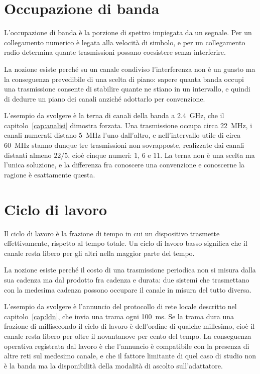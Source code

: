 \section{Occupazione di banda}

L'occupazione di banda è la porzione di spettro impiegata da un segnale. Per un collegamento numerico è legata alla velocità di simbolo, e per un collegamento radio determina quante trasmissioni possano coesistere senza interferire.

La nozione esiste perché su un canale condiviso l'interferenza non è un guasto ma la conseguenza prevedibile di una scelta di piano: sapere quanta banda occupi una trasmissione consente di stabilire quante ne stiano in un intervallo, e quindi di dedurre un piano dei canali anziché adottarlo per convenzione.

L'esempio da svolgere è la terna di canali della banda a \SI{2,4}{GHz}, che il capitolo~\ref{cap:analisi} dimostra forzata. Una trasmissione occupa circa \SI{22}{MHz}, i canali numerati distano \SI{5}{MHz} l'uno dall'altro, e nell'intervallo utile di circa \SI{60}{MHz} stanno dunque tre trasmissioni non sovrapposte, realizzate dai canali distanti almeno $22/5$, cioè cinque numeri: $1$, $6$ e $11$. La terna non è una scelta ma l'unica soluzione, e la differenza fra conoscere una convenzione e conoscerne la ragione è esattamente questa.

\section{Ciclo di lavoro}

Il ciclo di lavoro è la frazione di tempo in cui un dispositivo trasmette effettivamente, rispetto al tempo totale. Un ciclo di lavoro basso significa che il canale resta libero per gli altri nella maggior parte del tempo.

La nozione esiste perché il costo di una trasmissione periodica non si misura dalla sua cadenza ma dal prodotto fra cadenza e durata: due sistemi che trasmettano con la medesima cadenza possono occupare il canale in misura del tutto diversa.

L'esempio da svolgere è l'annuncio del protocollo di rete locale descritto nel capitolo~\ref{cap:ldn}, che invia una trama ogni \SI{100}{ms}. Se la trama dura una frazione di millisecondo il ciclo di lavoro è dell'ordine di qualche millesimo, cioè il canale resta libero per oltre il novantanove per cento del tempo. La conseguenza operativa registrata dal lavoro è che l'annuncio è compatibile con la presenza di altre reti sul medesimo canale, e che il fattore limitante di quel caso di studio non è la banda ma la disponibilità della modalità di ascolto sull'adattatore.

